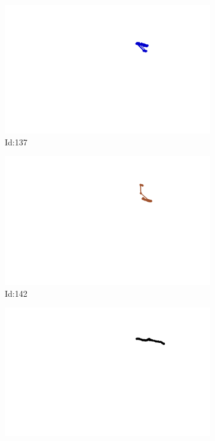 \documentclass[12pt,twoside]{report}
\begin{document}
\begin{figure}
\centering
\begin{subfigure}[b]{0.20\textwidth}
\centering
\includegraphics[width=\textwidth]{../../trajectories/137.png}
\caption{Id:137}
\end{subfigure}
\begin{subfigure}[b]{0.20\textwidth}
\centering
\includegraphics[width=\textwidth]{../../trajectories/142.png}
\caption{Id:142}
\end{subfigure}
\begin{subfigure}[b]{0.20\textwidth}
\centering
\includegraphics[width=\textwidth]{../../trajectories/161.png}

\end{subfigure}
\end{figure}
\end{document}
